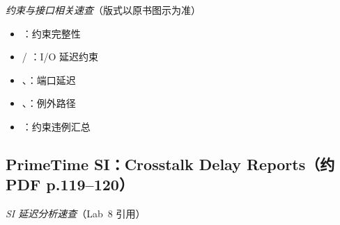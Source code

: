 \noindent\textit{约束与接口相关速查}（版式以原书图示为准）



\begin{itemize}

  \item {}：约束完整性

  \item {} / ：I/O 延迟约束

  \item {}、：端口延迟

  \item {}、：例外路径

  \item {}：约束违例汇总

\end{itemize}



\subsection{PrimeTime SI：Crosstalk Delay Reports（约 PDF p.119--120）}

\label{jobaid:si-delay}



\noindent\textit{SI 延迟分析速查}（Lab~8 引用）



